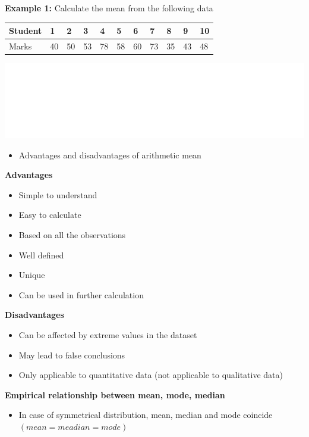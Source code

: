 \documentclass[]{book}
\providecommand{\tightlist}{%
  \setlength{\itemsep}{0pt}\setlength{\parskip}{0pt}}
\begin{document}
\textbf{Example 1:} Calculate the mean from the following data

\begin{longtable}[]{@{}lllllllllll@{}}
\toprule
Student & 1 & 2 & 3 & 4 & 5 & 6 & 7 & 8 & 9 & 10\tabularnewline
\midrule
\endhead
Marks & 40 & 50 & 53 & 78 & 58 & 60 & 73 & 35 & 43 & 48\tabularnewline
\bottomrule
\end{longtable}

\begin{center}\includegraphics[width=1\linewidth]{figure/mean1-1} \end{center}

\begin{itemize}
\tightlist
\item
  Advantages and disadvantages of arithmetic mean
\end{itemize}

\textbf{Advantages}

\begin{itemize}
\tightlist
\item
  Simple to understand
\item
  Easy to calculate
\item
  Based on all the observations
\item
  Well defined
\item
  Unique
\item
  Can be used in further calculation
\end{itemize}

\textbf{Disadvantages}

\begin{itemize}
\tightlist
\item
  Can be affected by extreme values in the dataset
\item
  May lead to false conclusions
\item
  Only applicable to quantitative data (not applicable to qualitative data)
\end{itemize}

\textbf{Empirical relationship between mean, mode, median}

\begin{itemize}
\tightlist
\item
  In case of symmetrical distribution, mean, median and mode coincide \((mean = meadian= mode)\)
\end{itemize}
\end{document}
